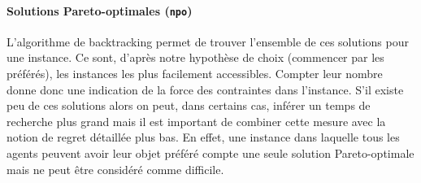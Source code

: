 \documentclass[../main.tex]{subfiles}
\begin{document}
	\paragraph{Solutions Pareto-optimales (\texttt{npo})}{L'algorithme de backtracking permet de trouver l'ensemble de ces solutions pour une instance. Ce sont, d'après notre hypothèse de choix (commencer par les préférés), les instances les plus facilement accessibles. Compter leur nombre donne donc une indication de la force des contraintes dans l'instance. S'il existe peu de ces solutions alors on peut, dans certains cas, inférer un temps de recherche plus grand mais il est important de combiner cette mesure avec la notion de regret détaillée plus bas. En effet, une instance dans laquelle tous les agents peuvent avoir leur objet préféré compte une seule solution Pareto-optimale mais ne peut être considéré comme difficile.}
	
\end{document}
